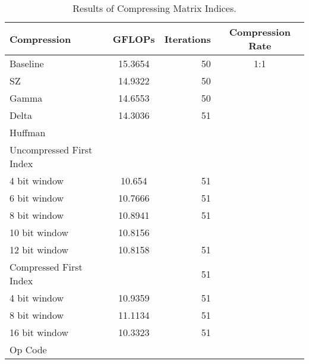 \begin{table}
	\centering
	\begin{tabular}{l|S|r|c}
		Compression & GFLOPs & Iterations & Compression Rate\\
		\hline
		Baseline & 15.3654 & 50 & 1:1 \\
		SZ & 14.9322 & 50 & \\
		Gamma & 14.6553 & 50 & \\ %
		Delta & 14.3036 & 51 & \\
		Huffman & & & \\
		\hspace{3mm}Uncompressed First Index & & & \\
			\hspace{6mm}4 bit window & 10.654 & 51 & \\
			\hspace{6mm}6 bit window & 10.7666 & 51 & \\
			\hspace{6mm}8 bit window & 10.8941 & 51 & \\
			\hspace{6mm}10 bit window & 10.8156 & & \\
			\hspace{6mm}12 bit window & 10.8158 & 51 & \\
		\hspace{3mm}Compressed First Index & & 51 & \\
			\hspace{6mm}4 bit window & 10.9359 & 51 & \\
			\hspace{6mm}8 bit window & 11.1134 & 51 & \\
			\hspace{6mm}16 bit window & 10.3323 & 51 & \\
		Op Code & & & \\
	\end{tabular}
	\caption{Results of Compressing Matrix Indices.}
	\label{tab:results-ind}
\end{table}
